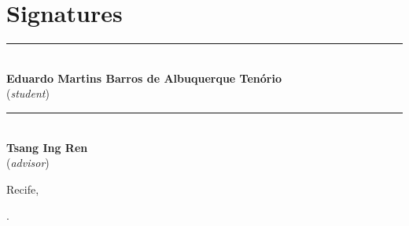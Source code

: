 \documentclass[a4paper,twocolumn]{article}
\begin{document}
\newpage

\section*{Signatures}

\begin{center}
\vspace{3cm}

\rule{0.5\textwidth}{.4pt}\\
\textbf{Eduardo Martins Barros de Albuquerque Tenório}\\
(\textit{student})

\vspace{3cm}

\rule{0.5\textwidth}{.4pt}\\
\textbf{Tsang Ing Ren}\\
(\textit{advisor})
\end{center}

\noindent Recife, \date{\today}.
\end{document}
